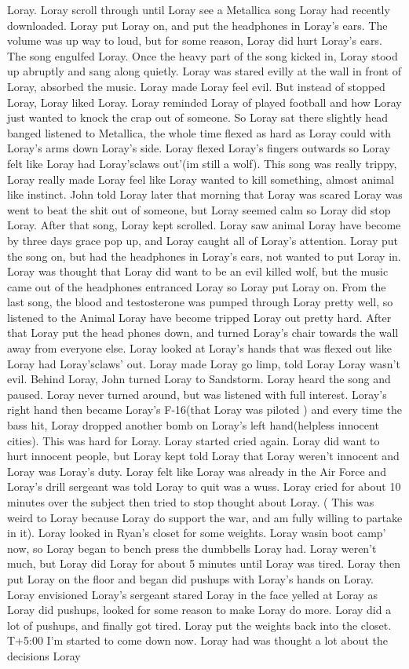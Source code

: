 \documentclass[12pt]{book}
\begin{document}
Loray. Loray scroll through until Loray see a Metallica song Loray had recently downloaded. Loray put Loray on, and put the headphones in Loray's ears. The volume was up way to loud, but for some reason, Loray did hurt Loray's ears. The song engulfed Loray. Once the heavy part of the song kicked in, Loray stood up abruptly and sang along quietly. Loray was stared evilly at the wall in front of Loray, absorbed the music. Loray made Loray feel evil. But instead of stopped Loray, Loray liked Loray. Loray reminded Loray of played football and how Loray just wanted to knock the crap out of someone. So Loray sat there slightly head banged listened to Metallica, the whole time flexed as hard as Loray could with Loray's arms down Loray's side. Loray flexed Loray's fingers outwards so Loray felt like Loray had Loray'sclaws out'(im still a wolf). This song was really trippy, Loray really made Loray feel like Loray wanted to kill something, almost animal like instinct. John told Loray later that morning that Loray was scared Loray was went to beat the shit out of someone, but Loray seemed calm so Loray did stop Loray. After that song, Loray kept scrolled. Loray saw animal Loray have become by three days grace pop up, and Loray caught all of Loray's attention. Loray put the song on, but had the headphones in Loray's ears, not wanted to put Loray in. Loray was thought that Loray did want to be an evil killed wolf, but the music came out of the headphones entranced Loray so Loray put Loray on. From the last song, the blood and testosterone was pumped through Loray pretty well, so listened to the Animal Loray have become tripped Loray out pretty hard. After that Loray put the head phones down, and turned Loray's chair towards the wall away from everyone else. Loray looked at Loray's hands that was flexed out like Loray had Loray'sclaws' out. Loray made Loray go limp, told Loray Loray wasn't evil. Behind Loray, John turned Loray to Sandstorm. Loray heard the song and paused. Loray never turned around, but was listened with full interest. Loray's right hand then became Loray's F-16(that Loray was piloted ) and every time the bass hit, Loray dropped another bomb on Loray's left hand(helpless innocent cities). This was hard for Loray. Loray started cried again. Loray did want to hurt innocent people, but Loray kept told Loray that Loray weren't innocent and Loray was Loray's duty. Loray felt like Loray was already in the Air Force and Loray's drill sergeant was told Loray to quit was a wuss. Loray cried for about 10 minutes over the subject then tried to stop thought about Loray. ( This was weird to Loray because Loray do support the war, and am fully willing to partake in it). Loray looked in Ryan's closet for some weights. Loray wasin boot camp' now, so Loray began to bench press the dumbbells Loray had. Loray weren't much, but Loray did Loray for about 5 minutes until Loray was tired. Loray then put Loray on the floor and began did pushups with Loray's hands on Loray. Loray envisioned Loray's sergeant stared Loray in the face yelled at Loray as Loray did pushups, looked for some reason to make Loray do more. Loray did a lot of pushups, and finally got tired. Loray put the weights back into the closet. T+5:00 I'm started to come down now. Loray had was thought a lot about the decisions Loray 
\end{document}
